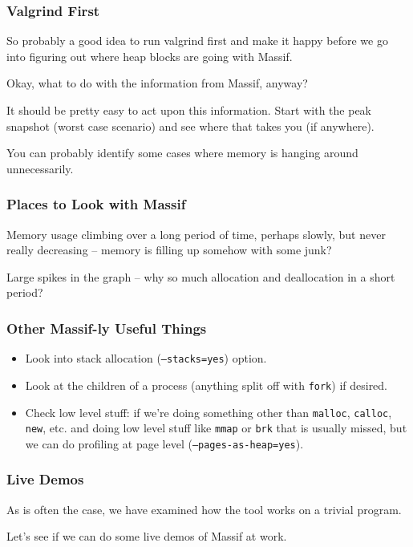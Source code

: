 \begin{frame}
\frametitle{Valgrind First}

So probably a good idea to run valgrind first and make it happy before we go into figuring out where heap blocks are going with Massif. 

Okay, what to do with the information from Massif, anyway? 

It should be pretty easy to act upon this information. Start with the peak snapshot (worst case scenario) and see where that takes you (if anywhere). 

You can probably identify some cases where memory is hanging around unnecessarily. 


\end{frame}


\begin{frame}
\frametitle{Places to Look with Massif}

Memory usage climbing over a long period of time, perhaps slowly, but never really decreasing -- memory is filling up somehow with some junk? 

Large spikes in the graph -- why so much allocation and deallocation in a short period?

\end{frame}



\begin{frame}
\frametitle{Other Massif-ly Useful Things}

\begin{itemize}
	\item Look into stack allocation (\texttt{--stacks=yes}) option.
	\item Look at the children of a process (anything split off with \texttt{fork}) if desired.
	\item Check low level stuff: if we're doing something other than \texttt{malloc}, \texttt{calloc}, \texttt{new}, etc. and doing low level stuff like \texttt{mmap} or \texttt{brk} that is usually missed, but we can do profiling at page level (\texttt{--pages-as-heap=yes}).
\end{itemize}


\end{frame}




\begin{frame}
\frametitle{Live Demos}

As is often the case, we have examined how the tool works on a trivial program. 

Let's see if we can do some live demos of Massif at work.

\end{frame}




